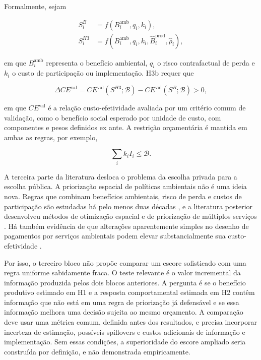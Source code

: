 Formalmente, sejam

\begin{align}
    S_i^{B}
    &= f\!\left(B_i^{\mathrm{amb}},q_i,k_i\right),
    \label{eq:baseline_score}\\
    S_i^{H3}
    &= f\!\left(B_i^{\mathrm{amb}},q_i,k_i,
       \widehat{B}_i^{\mathrm{prod}},\widehat{\rho}_i\right),
    \label{eq:expanded_score}
\end{align}

em que $B_i^{\mathrm{amb}}$ representa o benefício ambiental, $q_i$ o risco contrafactual de perda e $k_i$ o custo de participação ou implementação. H3b requer que

\begin{equation}
    \Delta CE^{\mathrm{val}}
    = CE^{\mathrm{val}}\!\left(S^{H3};\mathcal{B}\right)
    - CE^{\mathrm{val}}\!\left(S^{B};\mathcal{B}\right) > 0,
    \label{eq:incremental_ce}
\end{equation}

em que $CE^{\mathrm{val}}$ é a relação custo-efetividade avaliada por um critério comum de validação, como o benefício social esperado por unidade de custo, com componentes e pesos definidos ex ante. A restrição orçamentária é mantida em ambas as regras, por exemplo,

\begin{equation}
    \sum_i k_i I_i \leq \mathcal{B}.
    \label{eq:budget_constraint}
\end{equation}

A terceira parte da literatura desloca o problema da escolha privada para a escolha pública. A priorização espacial de políticas ambientais não é uma ideia nova. Regras que combinam benefícios ambientais, risco de perda e custos de participação são estudadas há pelo menos duas décadas \cite{wunscher2008targeting}, e a literatura posterior desenvolveu métodos de otimização espacial e de priorização de múltiplos serviços \cite{guo2020targeting}. Há também evidência de que alterações aparentemente simples no desenho de pagamentos por serviços ambientais podem elevar substancialmente sua custo-efetividade \cite{izquierdotort2024redesigning}.

Por isso, o terceiro bloco não propõe comparar um escore sofisticado com uma regra uniforme sabidamente fraca. O teste relevante é o valor incremental da informação produzida pelos dois blocos anteriores. A pergunta é se o benefício produtivo estimado em H1 e a resposta comportamental estimada em H2 contêm informação que não está em uma regra de priorização já defensável e se essa informação melhora uma decisão sujeita ao mesmo orçamento. A comparação deve usar uma métrica comum, definida antes dos resultados, e precisa incorporar incerteza de estimação, possíveis spillovers e custos adicionais de informação e implementação. Sem essas condições, a superioridade do escore ampliado seria construída por definição, e não demonstrada empiricamente.


